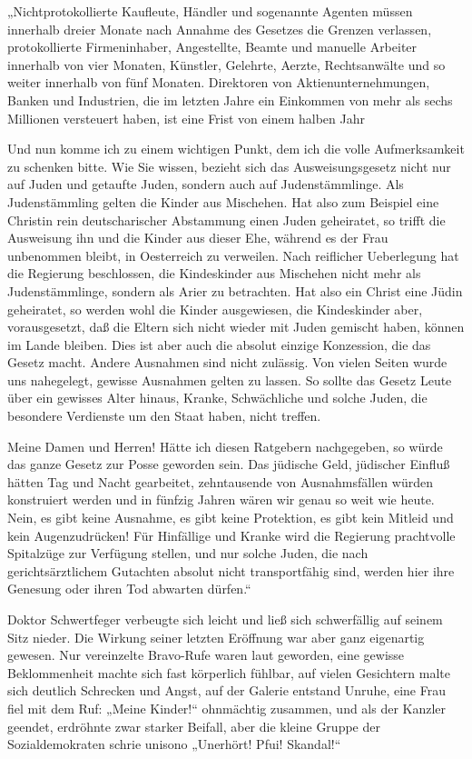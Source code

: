 „Nichtprotokollierte Kaufleute, Händler und sogenannte Agenten
müssen innerhalb dreier Monate nach Annahme des Gesetzes die
Grenzen verlassen, protokollierte Firmeninhaber, Angestellte,
Beamte und manuelle Arbeiter innerhalb von vier Monaten, Künstler,
Gelehrte, Aerzte, Rechtsanwälte und so weiter innerhalb von fünf
Monaten. Direktoren von Aktienunternehmungen, Banken und
Industrien, die im letzten Jahre ein Einkommen von mehr als sechs
Millionen versteuert haben, ist eine Frist von einem halben Jahr

Und nun komme ich zu einem wichtigen Punkt, dem ich die volle
Aufmerksamkeit zu schenken bitte. Wie Sie wissen, bezieht sich das
Ausweisungsgesetz nicht nur auf Juden und getaufte Juden, sondern
auch auf Judenstämmlinge. Als Judenstämmling gelten die Kinder aus
Mischehen. Hat also zum Beispiel eine Christin rein deutscharischer
Abstammung einen Juden geheiratet, so trifft die Ausweisung ihn und
die Kinder aus dieser Ehe, während es  der Frau
unbenommen bleibt, in Oesterreich zu verweilen. Nach reiflicher
Ueberlegung hat die Regierung beschlossen, die Kindeskinder aus
Mischehen nicht mehr als Judenstämmlinge, sondern als Arier zu
betrachten. Hat also ein Christ eine Jüdin geheiratet, so werden
wohl die Kinder ausgewiesen, die Kindeskinder aber, vorausgesetzt,
daß die Eltern sich nicht wieder mit Juden gemischt haben, können
im Lande bleiben. Dies ist aber auch die absolut einzige
Konzession, die das Gesetz macht. Andere Ausnahmen sind nicht
zulässig. Von vielen Seiten wurde uns nahegelegt, gewisse Ausnahmen
gelten zu lassen. So sollte das Gesetz Leute über ein gewisses
Alter hinaus, Kranke, Schwächliche und solche Juden, die besondere
Verdienste um den Staat haben, nicht treffen.

Meine Damen und Herren! Hätte ich diesen Ratgebern nachgegeben, so
würde das ganze Gesetz zur Posse geworden sein. Das jüdische Geld,
jüdischer Einfluß hätten Tag und Nacht gearbeitet, zehntausende von
Ausnahmsfällen würden konstruiert werden und in fünfzig Jahren
wären wir genau so weit wie heute. Nein, es gibt keine Ausnahme, es
gibt keine Protektion, es gibt kein Mitleid und kein
Augenzudrücken! Für Hinfällige und Kranke wird die Regierung
prachtvolle Spitalzüge zur Verfügung stellen, und nur solche Juden,
die nach gerichtsärztlichem Gutachten absolut nicht transportfähig
sind, werden hier ihre Genesung oder ihren Tod abwarten dürfen.“

Doktor Schwertfeger verbeugte sich leicht und ließ sich
schwerfällig auf seinem Sitz nieder. Die Wirkung seiner letzten
Eröffnung war aber ganz eigenartig gewesen.  Nur
vereinzelte Bravo-Rufe waren laut geworden, eine gewisse
Beklommenheit machte sich fast körperlich fühlbar, auf vielen
Gesichtern malte sich deutlich Schrecken und Angst, auf der Galerie
entstand Unruhe, eine Frau fiel mit dem Ruf: „Meine Kinder!“
ohnmächtig zusammen, und als der Kanzler geendet, erdröhnte zwar
starker Beifall, aber die kleine Gruppe der Sozialdemokraten schrie
unisono „Unerhört! Pfui! Skandal!“

